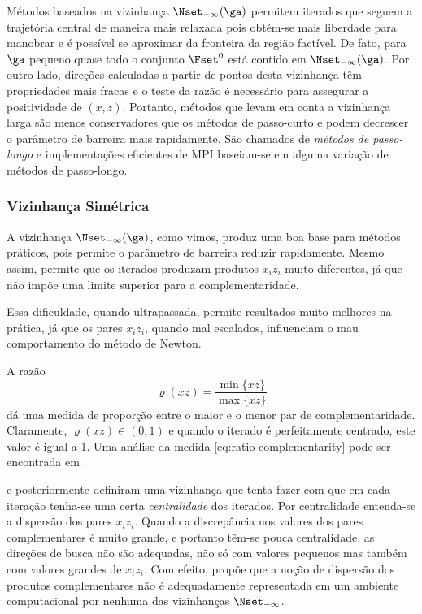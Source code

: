  
 Métodos baseados na vizinhança $\Nset_{-\infty}(\ga)$ permitem iterados que
 seguem a trajetória central de maneira mais relaxada  pois obtém-se mais
 liberdade para manobrar e é possível se aproximar da fronteira da região
 factível. De fato, para $\ga$ pequeno quase todo o conjunto $\Fset^0$ está
 contido em $\Nset_{-\infty}(\ga)$. Por outro lado, direções calculadas a partir
 de pontos desta vizinhança têm propriedades mais fracas e o teste da razão é
 necessário para assegurar a positividade de $(x,z)$. Portanto, métodos que
 levam em conta a vizinhança larga são menos conservadores que os métodos de
 passo-curto e podem decrescer o parâmetro de barreira mais rapidamente. São
 chamados de \emph{métodos de passo-longo}  e implementações eficientes de
 \ac{MPI} baseiam-se em alguma variação de métodos de passo-longo.
 
 \subsubsection{Vizinhança Simétrica}
\label{sec:symmetric-neig}  
 A vizinhança $\Nset_{-\infty}(\ga)$, como vimos,  produz uma boa base para
 métodos práticos, pois permite o parâmetro de barreira reduzir rapidamente.
 Mesmo assim, permite que os iterados produzam produtos $x_iz_i$ muito
 diferentes, já que não impõe uma limite superior para a complementaridade.
 
 Essa dificuldade, quando ultrapassada, permite resultados muito melhores na
 prática, já que os pares $x_iz_i$, quando mal escalados, influenciam o mau
 comportamento do método de Newton.
 
 A razão 
\begin{equation}
\label{eq:ratio-complementarity}
\varrho(xz) = \frac{\min\{xz\}}{\max\{xz\}}
\end{equation}
dá uma medida de proporção entre o maior e o menor par de complementaridade.
 Claramente, $\varrho(xz)\in(0,1)$ e quando o iterado é perfeitamente
centrado, este valor é igual a 1. Uma
análise da medida \eqref{eq:ratio-complementarity} pode ser encontrada em
\cite{Jansen:1jv}.
 

\citet{Gondzio:1996uw} e posteriormente \citet{Colombo:2008wm,Colombo:2008ia}
definiram uma vizinhança que tenta fazer com que em cada iteração tenha-se uma
certa \emph{centralidade} dos iterados.  Por centralidade entenda-se a
dispersão dos pares $x_iz_i$. Quando a discrepância nos
valores dos pares complementares é muito grande, e portanto têm-se pouca
centralidade, as direções de busca não são adequadas, não só com valores
pequenos mas também com valores grandes de $x_iz_i$. Com efeito, \citet[pp.
26]{Colombo:2008wm} propõe que a noção de dispersão dos produtos
complementares não é adequadamente  representada em um ambiente computacional
por nenhuma das  vizinhanças  $\Nset_{-\infty}$.



